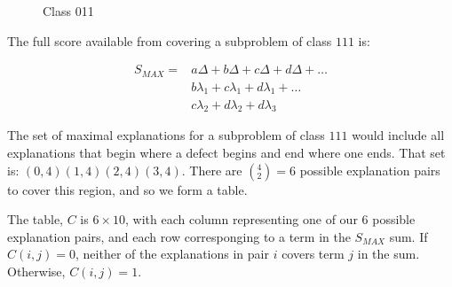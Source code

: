 \begin{figure}[h] \centering 
{} 
\caption{Class 011}
\end{figure}

The full score available from covering a subproblem of class $111$ is:

\begin{align*} 
S_{MAX} = &a \Delta + b \Delta + c \Delta + d \Delta + \hdots \\
& b \lambda_1 + c\lambda_1 + d\lambda_1 + \hdots \\
& c \lambda_2 + d \lambda_2 + d \lambda_3
\end{align*}

The set of maximal explanations for a subproblem of class $111$ would include all explanations that begin where a defect begins and end where one ends.  That set is: $ (0,4) (1,4) (2,4) (3,4)$.  There are $(^4_2) = 6$ possible explanation pairs to cover this region, and so we form a table.

The table, $C$ is $6 \times 10$, with each column representing one of our 6 possible explanation pairs, and each row corresponging to a term in the $S_{MAX}$ sum.  If $C(i,j) = 0$, neither of the explanations in pair $i$ covers term $j$ in the sum. Otherwise, $C(i,j) = 1$.

